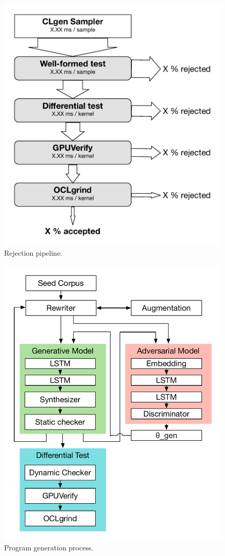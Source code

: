 \begin{figure}
        \centering
        \includegraphics[width=.8\columnwidth]{img/rej} %
        \caption{%
                Rejection pipeline.%
        }%
        \label{fig:deeptune}
\end{figure}

\begin{figure}
        \centering
        \includegraphics[width=.95\columnwidth]{img/proc} %
        \caption{%
                Program generation process.%
        }%
        \label{fig:deeptune}
\end{figure}

